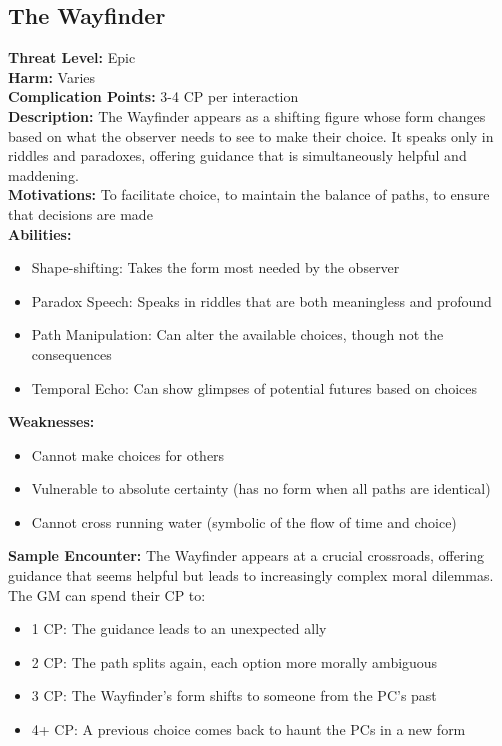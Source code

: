 \documentclass[11pt]{article}
\newenvironment{monsterentry}[1]{%
  \begin{mdframed}[backgroundcolor=shadecolor, linewidth=0pt, leftmargin=0pt, rightmargin=0pt]%
  \subsection*{#1}%
}{%
  \end{mdframed}%
}
\begin{document}
\begin{monsterentry}{The Wayfinder}
\textbf{Threat Level:} Epic \\
\textbf{Harm:} Varies \\
\textbf{Complication Points:} 3-4 CP per interaction \\
\textbf{Description:} The Wayfinder appears as a shifting figure whose form changes based on what the observer needs to see to make their choice. It speaks only in riddles and paradoxes, offering guidance that is simultaneously helpful and maddening. \\
\textbf{Motivations:} To facilitate choice, to maintain the balance of paths, to ensure that decisions are made \\
\textbf{Abilities:}
\begin{itemize}
    \item Shape-shifting: Takes the form most needed by the observer
    \item Paradox Speech: Speaks in riddles that are both meaningless and profound
    \item Path Manipulation: Can alter the available choices, though not the consequences
    \item Temporal Echo: Can show glimpses of potential futures based on choices
\end{itemize}
\textbf{Weaknesses:}
\begin{itemize}
    \item Cannot make choices for others
    \item Vulnerable to absolute certainty (has no form when all paths are identical)
    \item Cannot cross running water (symbolic of the flow of time and choice)
\end{itemize}
\textbf{Sample Encounter:} The Wayfinder appears at a crucial crossroads, offering guidance that seems helpful but leads to increasingly complex moral dilemmas. The GM can spend their CP to:
\begin{itemize}
    \item 1 CP: The guidance leads to an unexpected ally
    \item 2 CP: The path splits again, each option more morally ambiguous
    \item 3 CP: The Wayfinder's form shifts to someone from the PC's past
    \item 4+ CP: A previous choice comes back to haunt the PCs in a new form
\end{itemize}
\end{monsterentry}
\end{document}
